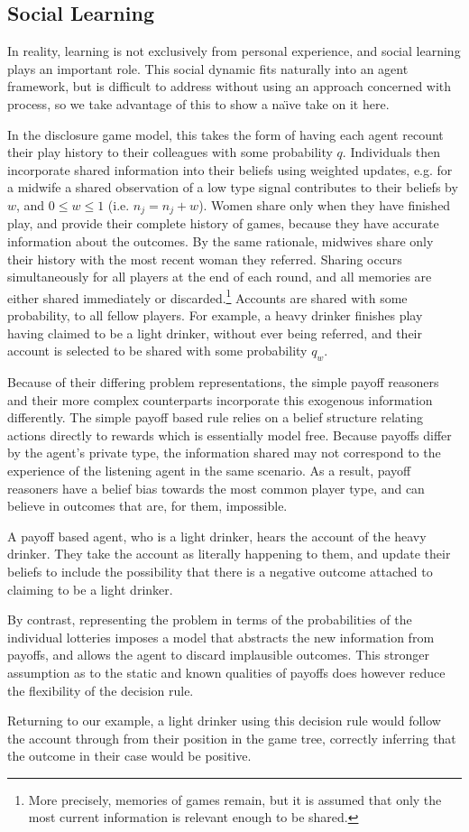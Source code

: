\subsection{Social Learning}
\label{sub:info_sharing}

In reality, learning is not exclusively from personal experience, and social learning plays an important role. This social dynamic fits naturally into an agent framework, but is difficult to address without using an approach concerned with process, so we take advantage of this to show a na{\"\i}ve take on it here.

In the disclosure game model, this takes the form of having each agent recount their play history to their colleagues with some probability \(q\). Individuals then incorporate shared information into their beliefs using weighted updates, e.g. for a midwife a shared observation of a low type signal contributes to their beliefs by \(w\), and \(0\leq w\leq 1\) (i.e. \(n_{j} = n_{j} + w\)).
Women share only when they have finished play, and provide their complete history of games, because they have accurate information about the outcomes. By the same rationale, midwives share only their history with the most recent woman they referred. Sharing occurs simultaneously for all players at the end of each round, and all memories are either shared immediately or discarded.\footnote{More precisely, memories of games remain, but it is assumed that only the most current information is relevant enough to be shared.} Accounts are shared with some probability, to all fellow players. For example, a heavy drinker finishes play having claimed to be a light drinker, without ever being referred, and their account is selected to be shared with some probability $q_{w}$. 

Because of their differing problem representations, the simple payoff reasoners and their more complex counterparts incorporate this exogenous information differently. The simple payoff based rule relies on a belief structure relating actions directly to rewards which is essentially model free. Because payoffs differ by the agent's private type, the information shared may not correspond to the experience of the listening agent in the same scenario. As a result, payoff reasoners have a belief bias towards the most common player type, and can believe in outcomes that are, for them, impossible.

A payoff based agent, who is a light drinker, hears the account of the heavy drinker. They take the account as literally happening to them, and update their beliefs to include the possibility that there is a negative outcome attached to claiming to be a light drinker.

By contrast, representing the problem in terms of the probabilities of the individual lotteries imposes a model that abstracts the new information from payoffs, and allows the agent to discard implausible outcomes. This stronger assumption as to the static and known qualities of payoffs does however reduce the flexibility of the decision rule.

Returning to our example, a light drinker using this decision rule would follow the account through from their position in the game tree, correctly inferring that the outcome in their case would be positive.